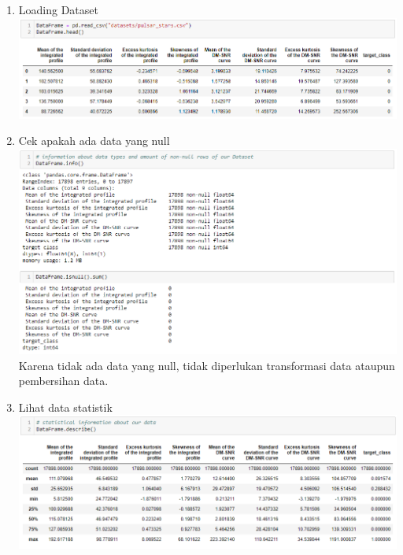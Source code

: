 \documentclass[12pt]{article}
\begin{document}
    \begin{enumerate}
    
        \item Loading Dataset
        \newline \includegraphics[scale=0.5125]{data-head.png}
        \newline
        
        \item Cek apakah ada data yang null
        \newline \includegraphics[scale=0.5125]{data-info.png}
        \newline Karena tidak ada data yang null, tidak diperlukan transformasi data ataupun pembersihan data.
        
        \item Lihat data statistik
        \newline \includegraphics[scale=0.5125]{data-describe.png}
        
        \newpage
        

\end{enumerate}
\end{document}
